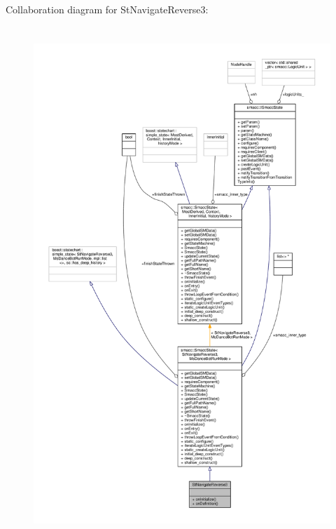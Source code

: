 Collaboration diagram for St\+Navigate\+Reverse3\+:
\nopagebreak
\begin{figure}[H]
\begin{center}
\leavevmode
\includegraphics[height=550pt]{structStNavigateReverse3__coll__graph}
\end{center}
\end{figure}

